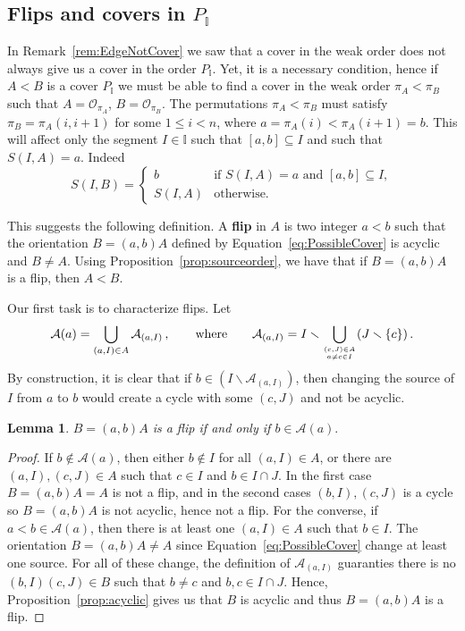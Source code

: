 \documentclass[reqno]{amsart}
\newtheorem{lemma}[theorem]{Lemma}
\theoremstyle{definition}
\newcommand{\ssm}{\smallsetminus} %
\newcommand{\defn}[1]{\textbf{\textsf{\color{PineGreen} #1}}} %
\newcommand{\Or}{\mathcal O}  %
\newcommand{\II}{\mathbb I} %
\newcommand{\cA}{\mathcal A} %
\begin{document}
\subsection{Flips and covers in $P_\II$}  
\label{subsec:cover}

In Remark~\ref{rem:EdgeNotCover} we saw that a cover in the weak order does not always give us a cover  in the order $P_\II$. Yet, it is a necessary condition, hence if
$A<B$ is a cover  $P_\II$ we must be able to find a cover in the weak order $\pi_A<\pi_B$  such that $A=\Or_{\pi_A}$, $B=\Or_{\pi_B}$. The permutations $\pi_A<\pi_B$ 
must satisfy $\pi_B=\pi_A(i,i+1)$ for some $1\le i<n$, where $a=\pi_A(i)<\pi_A(i+1)=b$.
This will affect only the segment $I\in \II$ such that $[a,b]\subseteq I$ and such that $S(I,A)=a$. Indeed
\begin{equation}\label{eq:PossibleCover}
 	S(I,B)=\begin{cases}
		b& \text{if $S(I,A) = a$ and $[a,b]\subseteq I$},\\
		S(I,A)& \text{otherwise.}
	\end{cases}
\end{equation}

This suggests the following definition. A \defn{flip} in $A$ is two integer $a<b$ such that the orientation $B=(a,b)A$ defined by Equation~\eqref{eq:PossibleCover}
is acyclic and $B\ne A$. Using Proposition~\ref{prop:sourceorder}, we have that if $B=(a,b)A$ is a flip, then $A<B$. 


Our first task is to characterize flips. Let
 $$\cA(a)=\bigcup_{(a,I)\in A} \cA_{(a,I)}\,,\qquad\text{where}\qquad
 \cA_{(a,I)}= I \ssm  \bigcup_{(c,J)\in A \atop a\ne c\in I} (J\ssm \{c\})\,.$$
By construction, it is clear that if $b\in (I\ssm \cA_{(a,I)})$, then changing the source of $I$ from $a$ to $b$ would create a cycle with some $(c,J)$ and not be acyclic.

\begin{lemma}\label{lem:isaflip}
$B=(a,b)A$ is a flip if and only if $b\in \cA(a).$
\end{lemma}

\begin{proof}
If $b\not\in \cA (a)$, then either $b\not\in I$ for all $(a,I)\in A$, or there are $(a,I),(c,J)\in A$ such that $c\in I$ and  $b\in I\cap J$. In the first case $B=(a,b)A=A$ is not a flip, and in the second cases $(b,I),(c,J)$ is a cycle so 
$B=(a,b)A$ is not acyclic, hence not a flip.  For the converse, if $a<b\in \cA (a)$, then there is at least one $(a,I)\in A$ such that $b\in I$. The orientation $B=(a,b)A\ne A$ since Equation~\eqref{eq:PossibleCover} change at least one source.
For all of these change,  the definition of  $\cA_{(a,I)}$ guaranties there is no $(b,I)(c,J)\in B$ such that $b\ne c$ and $b,c\in I\cap J$. Hence, Proposition~\ref{prop:acyclic} gives us that $B$ is acyclic and thus $B=(a,b)A$ is a flip.
\end{proof}
\end{document}
